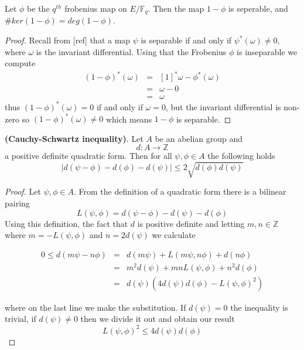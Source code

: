 \begin{thm}
 Let $\phi$ be the $q^{th}$ frobenius map on $E/\mathbb{F}_q$. Then the map $1-\phi$ is seperable, and
$\#ker(1-\phi) = deg(1-\phi)$.
\end{thm}
\begin{proof}
  Recall from [ref] that a map $\psi$ is separable if and only if $\psi^*(\omega) \neq 0$,
where $\omega$ is the invariant differential. Using that the Frobenius $\phi$ is inseparable
we compute
\begin{eqnarray}
 (1-\phi)^*(\omega) &=& [1]^*\omega - \phi^*(\omega) \nonumber \\
		    &=& \omega - 0 \nonumber \\
		    &=& \omega \nonumber
\end{eqnarray}
thus $(1-\phi)^*(\omega) = 0$ if and only if $\omega = 0$, but the invariant differential is non-zero
so $(1-\phi)^*(\omega) \neq 0$ which means $1-\phi$ is separable.
\end{proof}

\begin{lemma}
 \textbf{(Cauchy-Schwartz inequality)}. Let $A$ be an abelian group and
$$ d: A \rightarrow \mathbb{Z} $$
a positive definite quadratic form. Then for all $\psi, \phi \in A$ the following holds
$$ |d(\psi-\phi)-d(\phi)-d(\psi)| \leq 2 \sqrt{d(\phi)d(\psi)} $$
\end{lemma}
\begin{proof}
 Let $\psi, \phi \in A$. From the definition of a quadratic form there is a bilinear pairing
$$ L(\psi, \phi) = d(\psi-\phi) - d(\psi) - d(\phi) $$
Using this definition, the fact that $d$ is positive definite and letting $m,n \in \mathbb{Z}$ where
$m = -L(\psi, \phi)$ and $n = 2d(\psi)$ we calculate

\begin{eqnarray}
 0 \leq d(m\psi - n\phi) &=& d(m\psi) + L(m\psi, n\phi) + d(n\phi) \nonumber \\
			 &=& m^2 d(\psi) + mnL(\psi,\phi) + n^2 d(\phi) \nonumber \\
			 &=& d(\psi) \left( 4d(\psi)d(\phi)-L(\psi, \phi)^2 \right) \nonumber 
\end{eqnarray}

where on the last line we make the substitution. If $d(\psi)=0$ the inequality is trivial, if
$d(\psi) \neq 0$ then we divide it out and obtain our result
$$L(\psi, \phi)^2 \leq 4d(\psi)d(\phi) $$
\end{proof}

